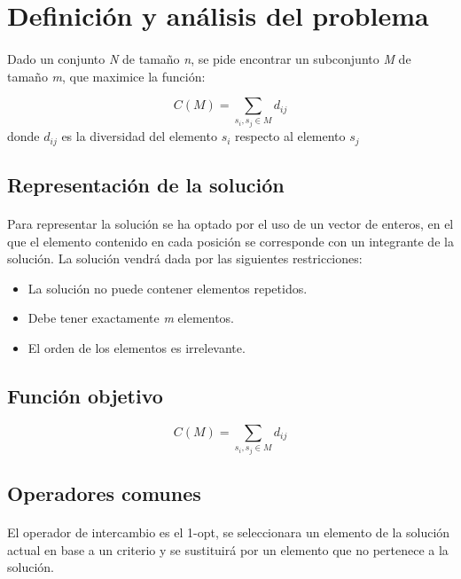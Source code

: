 	\section{Definición y análisis del problema}
	
	\paragraph{}Dado un conjunto \emph{N} de tamaño \emph{n}, se pide encontrar un subconjunto \emph{M} de tamaño \emph{m}, que maximice
	la función: 
	
		\[ C(M)=\sum_{s_i , s_j \in M} d_{ij}\]
	donde  $d_{ij}$ es la diversidad del elemento $s_i$ respecto al elemento $s_j$
	
	\subsection{Representación de la solución}
	
	\paragraph{} Para representar la solución se ha optado por el uso de un vector de enteros, en el que el elemento contenido en cada posición se corresponde con un integrante de la solución. La solución vendrá dada por las siguientes restricciones:
		\begin{itemize}
			
			\item La solución no puede contener elementos repetidos.
			
			\item Debe tener exactamente \emph{m} elementos.
			
			\item El orden de los elementos es irrelevante.
			
		\end{itemize}
	
	
	\subsection{Función objetivo}
	
	\[ C(M)=\sum_{s_i , s_j \in M} d_{ij}\]
	
	\subsection{Operadores comunes}
	
	\paragraph{}El operador de intercambio es el 1-opt, se seleccionara un elemento de la solución actual en base a un criterio y se sustituirá por un elemento que no pertenece a la solución. 
	

